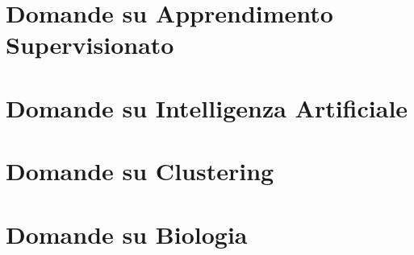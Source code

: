 \section{Domande su Apprendimento Supervisionato}


\section{Domande su Intelligenza Artificiale}


\section{Domande su Clustering}


\section{Domande su Biologia}




